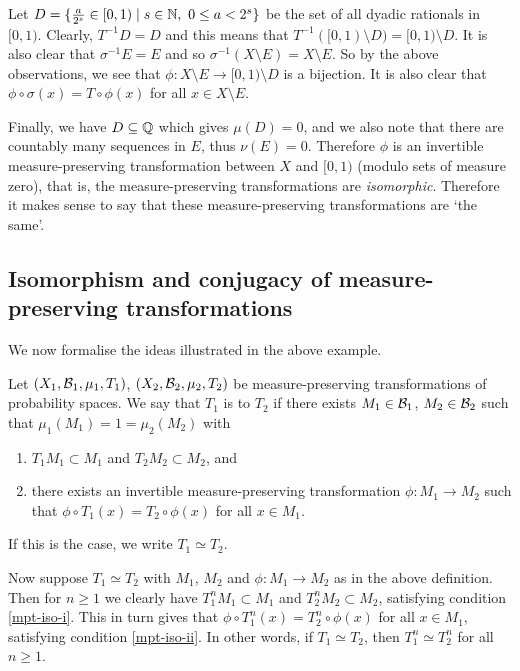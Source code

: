 Let $D = \{\frac{a}{2^s} \in [0, 1) \mid s \in \mathbb{N},\ 0 \leq a < 2^s\}$ be the set of all dyadic rationals in $[0, 1)$. Clearly, $T^{-1}D = D$ and this means that $T^{-1}([0, 1) \setminus D) = [0, 1) \setminus D$. It is also clear that $\sigma^{-1}E = E$ and so $\sigma^{-1}(X \setminus E) = X \setminus E$. So by the above observations, we see that $\phi: X \setminus E \to [0, 1) \setminus D$ is a bijection. It is also clear that $\phi \circ \sigma(x) = T \circ \phi(x)$ for all $x \in X \setminus E$.

Finally, we have $D \subseteq \mathbb{Q}$ which gives $\mu(D) = 0$, and we also note that there are countably many sequences in $E$, thus $\nu(E) = 0$. Therefore $\phi$ is an invertible measure-preserving transformation between $X$ and $[0, 1)$ (modulo sets of measure zero), that is, the measure-preserving transformations are \emph{isomorphic}. Therefore it makes sense to say that these measure-preserving transformations are `the same'.

\subsection{\texorpdfstring{\sloppy Isomorphism and conjugacy of measure-preserving transformations}{Isomorphism and conjugacy of measure-preserving transformations}}
We now formalise the ideas illustrated in the above example.

\begin{definition}
	\sloppy Let $(X_1, \mathcal{B}_1, \mu_1, T_1)$, $(X_2, \mathcal{B}_2, \mu_2, T_2)$ be measure-preserving transformations of probability spaces. We say that $T_1$ is  to $T_2$ if there exists $M_1 \in \mathcal{B}_1$, $M_2 \in \mathcal{B}_2$ such that $\mu_1(M_1) = 1 = \mu_2(M_2)$ with
	\begin{enumerate}
		\item $T_1{M_1} \subset M_1$ and $T_2{M_2} \subset M_2$, and \label{mpt-iso-i}
		\item there exists an invertible measure-preserving transformation $\phi : M_1 \to M_2$ such that $\phi \circ T_1(x) = T_2 \circ \phi(x)$ for all $x \in M_1$. \label{mpt-iso-ii}
	\end{enumerate}
	If this is the case, we write $T_1 \simeq T_2$.
\end{definition}

Now suppose $T_1 \simeq T_2$ with $M_1$, $M_2$ and $\phi : M_1 \to M_2$ as in the above definition. Then for $n \geq 1$ we clearly have $T_1^n{M_1} \subset M_1$ and $T_2^n{M_2} \subset M_2$, satisfying condition \ref{mpt-iso-i}. This in turn gives that $\phi \circ T_1^n(x) = T_2^n \circ \phi(x)$ for all $x \in M_1$, satisfying condition \ref{mpt-iso-ii}. In other words, if $T_1 \simeq T_2$, then $T_1^n \simeq T_2^n$ for all $n \geq 1$.

